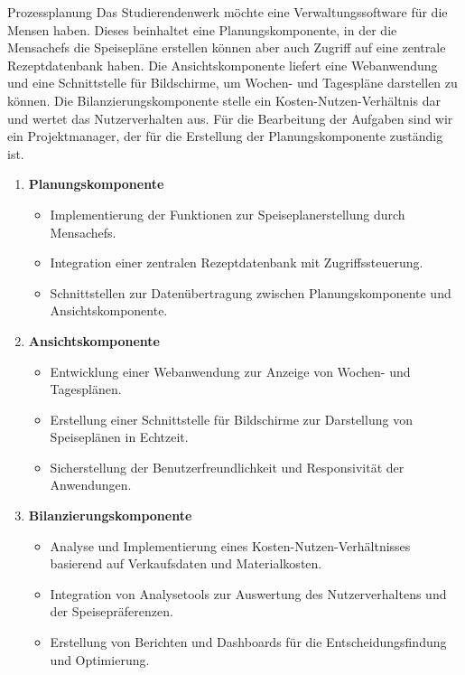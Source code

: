 \documentclass{article}
\begin{document}
\begin{exercise}{Prozessplanung}
  Das Studierendenwerk möchte eine Verwaltungssoftware für die Mensen haben. Dieses beinhaltet eine Planungskomponente, in der die Mensachefs die Speisepläne erstellen können aber auch Zugriff auf eine zentrale Rezeptdatenbank haben. Die Ansichtskomponente liefert eine Webanwendung und eine Schnittstelle für Bildschirme, um Wochen- und Tagespläne darstellen zu können. Die Bilanzierungskomponente stelle ein Kosten-Nutzen-Verhältnis dar und wertet das Nutzerverhalten aus. Für die Bearbeitung der Aufgaben sind wir ein Projektmanager, der für die Erstellung der Planungskomponente zuständig ist.

  \begin{enumerate}
    \item \textbf{Planungskomponente}
          \begin{itemize}
            \item Implementierung der Funktionen zur Speiseplanerstellung durch Mensachefs.
            \item Integration einer zentralen Rezeptdatenbank mit Zugriffssteuerung.
            \item Schnittstellen zur Datenübertragung zwischen Planungskomponente und Ansichtskomponente.
          \end{itemize}

    \item \textbf{Ansichtskomponente}
          \begin{itemize}
            \item Entwicklung einer Webanwendung zur Anzeige von Wochen- und Tagesplänen.
            \item Erstellung einer Schnittstelle für Bildschirme zur Darstellung von Speiseplänen in Echtzeit.
            \item Sicherstellung der Benutzerfreundlichkeit und Responsivität der Anwendungen.
          \end{itemize}

    \item \textbf{Bilanzierungskomponente}
          \begin{itemize}
            \item Analyse und Implementierung eines Kosten-Nutzen-Verhältnisses basierend auf Verkaufsdaten und Materialkosten.
            \item Integration von Analysetools zur Auswertung des Nutzerverhaltens und der Speisepräferenzen.
            \item Erstellung von Berichten und Dashboards für die Entscheidungsfindung und Optimierung.
          \end{itemize}
  \end{enumerate}


\end{exercise}
\end{document}
